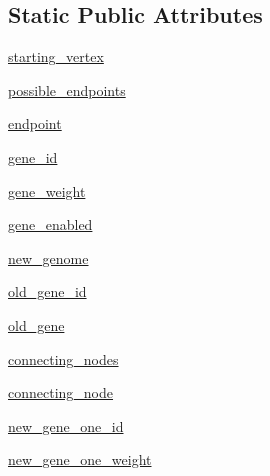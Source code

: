\subsection*{Static Public Attributes}
\begin{DoxyCompactItemize}
\item 
\hyperlink{classNEAT__PyGenetics_1_1NEAT_1_1Generator_1_1Mutator_1_1Mutator_a74faa3a8d9acd9c1c0a68e145441fc5b}{starting\+\_\+vertex}
\item 
\hyperlink{classNEAT__PyGenetics_1_1NEAT_1_1Generator_1_1Mutator_1_1Mutator_add17af09898bf2a4203fed77bc404161}{possible\+\_\+endpoints}
\item 
\hyperlink{classNEAT__PyGenetics_1_1NEAT_1_1Generator_1_1Mutator_1_1Mutator_a7f7f636e283125c144a7781a6ac5afaa}{endpoint}
\item 
\hyperlink{classNEAT__PyGenetics_1_1NEAT_1_1Generator_1_1Mutator_1_1Mutator_a6479cbdd1acaed28cbdbdbc6d663ec89}{gene\+\_\+id}
\item 
\hyperlink{classNEAT__PyGenetics_1_1NEAT_1_1Generator_1_1Mutator_1_1Mutator_a85333a494bf1858ec78e1a304c5c25ec}{gene\+\_\+weight}
\item 
\hyperlink{classNEAT__PyGenetics_1_1NEAT_1_1Generator_1_1Mutator_1_1Mutator_a231e7983bed77578ecaa3d9b1d13e037}{gene\+\_\+enabled}
\item 
\hyperlink{classNEAT__PyGenetics_1_1NEAT_1_1Generator_1_1Mutator_1_1Mutator_a738d393eb3669111cf0fda1485019ca3}{new\+\_\+genome}
\item 
\hyperlink{classNEAT__PyGenetics_1_1NEAT_1_1Generator_1_1Mutator_1_1Mutator_a65fc450affae2ea20311a30dc4fb69af}{old\+\_\+gene\+\_\+id}
\item 
\hyperlink{classNEAT__PyGenetics_1_1NEAT_1_1Generator_1_1Mutator_1_1Mutator_a0dfab1f6afdafcbcb3f907471b66d588}{old\+\_\+gene}
\item 
\hyperlink{classNEAT__PyGenetics_1_1NEAT_1_1Generator_1_1Mutator_1_1Mutator_a2b1d1d4ca57366264f0e1648c575023f}{connecting\+\_\+nodes}
\item 
\hyperlink{classNEAT__PyGenetics_1_1NEAT_1_1Generator_1_1Mutator_1_1Mutator_aeaff4debf91f61a735965c3533ae1e6c}{connecting\+\_\+node}
\item 
\hyperlink{classNEAT__PyGenetics_1_1NEAT_1_1Generator_1_1Mutator_1_1Mutator_a346f32875edc5cb74b3d3555eaea80f9}{new\+\_\+gene\+\_\+one\+\_\+id}
\item 
\hyperlink{classNEAT__PyGenetics_1_1NEAT_1_1Generator_1_1Mutator_1_1Mutator_a77e03377943c33be52a1da66028c9386}{new\+\_\+gene\+\_\+one\+\_\+weight}
\item 

\end{DoxyCompactItemize}
